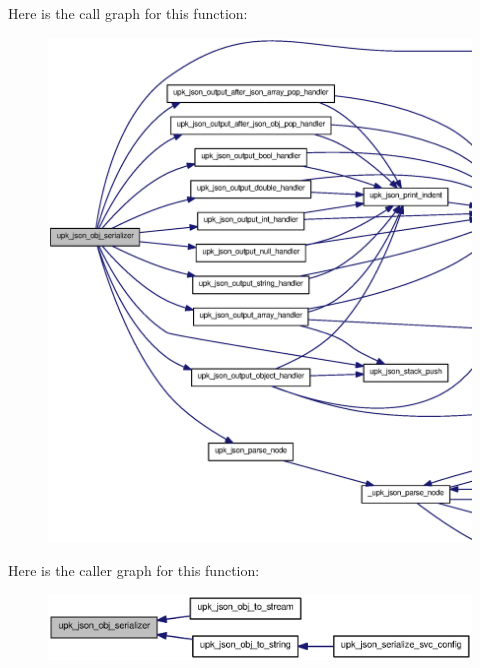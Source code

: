 Here is the call graph for this function:
\nopagebreak
\begin{figure}[H]
\begin{center}
\leavevmode
\includegraphics[width=400pt]{upk__json_8c_af1db52886c19222aa7efc1217809d8a3_cgraph}
\end{center}
\end{figure}




Here is the caller graph for this function:
\nopagebreak
\begin{figure}[H]
\begin{center}
\leavevmode
\includegraphics[width=400pt]{upk__json_8c_af1db52886c19222aa7efc1217809d8a3_icgraph}
\end{center}
\end{figure}


